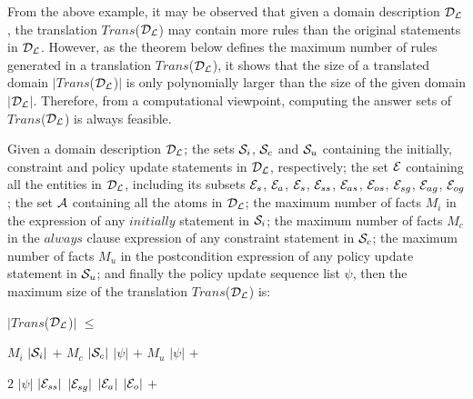 \documentclass[global,twocolumn,final]{svjour}
\newenvironment{vtheorem}[1]
  {\begin{theorem}[#1]\hspace{0.25em}}
  {\end{theorem}}
\newenvironment{vquote}
  {\begin{list}{}{\leftmargin 1em}\item[]}
  {\end{list}}
\begin{document}
        From the above example, it may be observed that given a domain
        description ${\cal D_{L}}$, the translation $Trans$(${\cal D_{L}}$) may
        contain more rules than the original statements in ${\cal D_{L}}$.
        However, as the theorem below defines the maximum number of rules
        generated in a translation $Trans$(${\cal D_{L}}$), it shows that
        the size of a translated domain $|$$Trans$(${\cal D_{L}}$)$|$ is only
        polynomially larger than the size of the given domain
        $|$${\cal D_{L}}$$|$. Therefore, from a computational viewpoint,
        computing the answer sets of $Trans$(${\cal D_{L}}$) is always
        feasible.

        \begin{vtheorem}{Translation Size}
          \label{the-size}
          Given a domain description ${\cal D_{L}}$; the sets ${\cal S}_{i}$,
          ${\cal S}_{c}$ and ${\cal S}_{u}$ containing the initially,
          constraint and policy update statements in ${\cal D_{L}}$,
          respectively; the set ${\cal E}$ containing all the entities in
          ${\cal D_{L}}$, including its subsets ${\cal E}_{s}$, ${\cal E}_{a}$,
          ${\cal E}_{s}$, ${\cal E}_{ss}$, ${\cal E}_{as}$, ${\cal E}_{os}$,
          ${\cal E}_{sg}$, ${\cal E}_{ag}$, ${\cal E}_{og}$; the set ${\cal A}$
          containing all the atoms in ${\cal D_{L}}$; the maximum number
          of facts $M_{i}$ in the expression of any $initially$ statement in
          ${\cal S}_{i}$; the maximum number of facts $M_{c}$ in the $always$
          clause expression of any constraint statement in ${\cal S}_{c}$;
          the maximum number of facts $M_{u}$ in the postcondition expression
          of any policy update statement in ${\cal S}_{u}$; and finally the
          policy update sequence list $\psi$, then the maximum size of the
          translation $Trans$(${\cal D_{L}}$) is:

         \begin{vquote}
            $|$$Trans$(${\cal D_{L}}$)$|$ $\leq$

            \hspace{1em}
            $M_{i}$ $|{\cal S}_{i}|$ $+$
            $M_{c}$ $|{\cal S}_{c}|$ $|\psi|$ $+$
            $M_{u}$ $|\psi|$ $+$

            \hspace{1em}
            $2$ $|\psi|$ $|{\cal E}_{ss}|$ $|{\cal E}_{sg}|$ $|{\cal E}_{a}|$ $|{\cal E}_{o}|$ $+$


\end{vquote}
\end{vtheorem}
\end{document}
